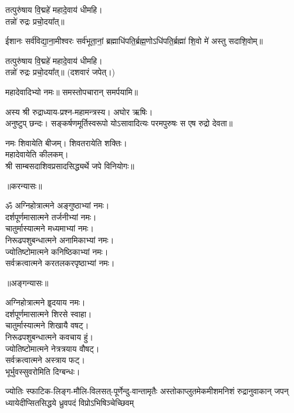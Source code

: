 तत्पुरु॑षाय वि॒द्महे॑ महादे॒वाय॑ धीमहि।\\
तन्नो॑ रुद्रः प्रचो॒दया᳚त्॥

ईशानः सर्व॑विद्या॒ना॒मीश्वरः सर्व॑भूता॒नां॒ ब्रह्माधि॑पति॒र्ब्रह्म॒णो\-ऽधि॑पति॒र्ब्रह्मा॑ शि॒वो मे॑ अस्तु सदाशि॒वोम्॥

तत्पुरु॑षाय वि॒द्महे॑ महादे॒वाय॑ धीमहि।\\
तन्नो॑ रुद्रः प्रचो॒दया᳚त्॥ (दशवारं जपेत्।)

महादेवादिभ्यो नमः॥ समस्तोपचारान् समर्पयामि॥

{\small \closesection}


{\small \closesection}


अस्य श्री रुद्राध्याय-प्रश्न-महामन्त्रस्य। अघोर ऋषिः।\\
अनुष्टुप् छन्दः। सङ्कर्षणमूर्तिस्वरूपो योऽसावादित्यः परमपुरुषः स एष रुद्रो देवता॥

नमः शिवायेति बीजम्। शिवतरायेति शक्तिः।\\
महादेवायेति कीलकम्।\\
श्री साम्बसदाशिवप्रसादसिद्ध्यर्थे जपे विनियोगः॥\\


\centerline{॥करन्यासः॥}
ॐ अग्निहोत्रात्मने अङ्गुष्ठाभ्यां नमः।\\
दर्शपूर्णमासात्मने तर्जनीभ्यां नमः।\\
चातुर्मास्यात्मने मध्यमाभ्यां नमः।\\
निरूढपशुबन्धात्मने अनामिकाभ्यां नमः।\\
ज्योतिष्टोमात्मने कनिष्ठिकाभ्यां नमः।\\
सर्वक्रत्वात्मने करतलकरपृष्ठाभ्यां  नमः।\\


\centerline{॥अङ्गन्यासः॥}
अग्निहोत्रात्मने हॄदयाय नमः।\\
दर्शपूर्णमासात्मने शिरसे स्वाहा।\\
चातुर्मास्यात्मने शिखायै वषट्।\\
निरूढपशुबन्धात्मने कवचाय हुं।\\
ज्योतिष्टोमात्मने नेत्रत्रयाय वौषट्।\\
सर्वक्रत्वात्मने अस्त्राय फट्।\\
भूर्भुवस्सुवरोमिति दिग्बन्धः।\\

\setlength{\shlokaspaceskip}{2pt}

{ज्योतिः स्फाटिक-लिङ्ग-मौलि-विलसत्-पूर्णेन्दु-वान्तामृतैः}
{अस्तोकाप्लुतमेकमीशमनिशं रुद्रानुवाकान् जपन्}
{ध्यायेदीप्सितसिद्धये ध्रुवपदं विप्रोऽभिषिञ्चेच्छिवम्}

